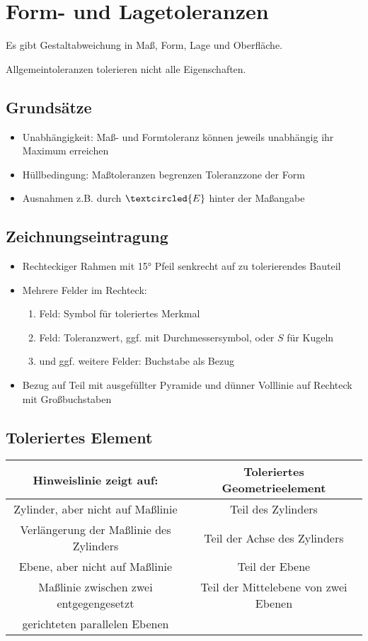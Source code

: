 \documentclass[a4paper,parskip=half*,DIV=7,fontsize=11pt]{scrartcl}
\begin{document}
\section{Form- und Lagetoleranzen}
Es gibt Gestaltabweichung in Maß, Form, Lage und Oberfläche.
	
Allgemeintoleranzen tolerieren nicht alle Eigenschaften.
\subsection{Grundsätze}
\begin{itemize}
	\item Unabhängigkeit: Maß- und Formtoleranz können jeweils unabhängig ihr Maximum erreichen
	\item Hüllbedingung: Maßtoleranzen begrenzen Toleranzzone der Form
	\item Ausnahmen z.B. durch $\textcircled{\tiny E}$ hinter der Maßangabe
\end{itemize}
	
\subsection{Zeichnungseintragung}
\begin{itemize}
	\item Rechteckiger Rahmen mit 15° Pfeil senkrecht auf zu tolerierendes Bauteil
	\item Mehrere Felder im Rechteck:
	      \begin{enumerate}
	      	\item Feld: Symbol für toleriertes Merkmal
	      	\item Feld: Toleranzwert, ggf. mit Durchmessersymbol, oder $S$ für Kugeln
	      	\item und ggf. weitere Felder: Buchstabe als Bezug
	      \end{enumerate}
	\item Bezug auf Teil mit ausgefüllter Pyramide und dünner Volllinie auf Rechteck mit Großbuchstaben
\end{itemize}

\subsection{Toleriertes Element}
\begin{tabular}{|c|c|}
	\hline
	\textbf{Hinweislinie zeigt auf:} & \textbf{Toleriertes Geometrieelement}\\
	\hline
	Zylinder, aber nicht auf Maßlinie & Teil des Zylinders\\
	\hline
	Verlängerung der Maßlinie des Zylinders & Teil der Achse des Zylinders\\
	\hline
	Ebene, aber nicht auf Maßlinie & Teil der Ebene\\
	\hline
	Maßlinie zwischen zwei entgegengesetzt & Teil der Mittelebene von zwei Ebenen \\ gerichteten parallelen Ebenen & \\
	\hline
\end{tabular}
	
\end{document}
